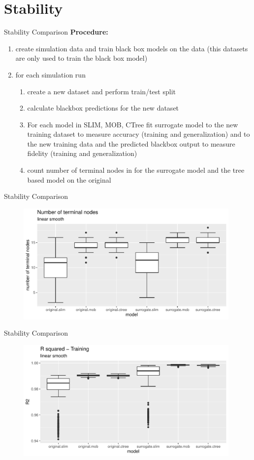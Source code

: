 \documentclass[9pt, xcolor=table]{beamer}
\begin{document}
\section{Stability}
\begin{frame}{Stability Comparison}
\textbf{Procedure:} 
\begin{enumerate}
    \item create simulation data and train black box models on the data (this datasets are only used to train the black box model)
    \item for each simulation run 
    \begin{enumerate}
        \item create a new dataset and perform train/test split
        \item calculate blackbox predictions for the new dataset
        \item For each model in SLIM, MOB, CTree fit surrogate model to the new training dataset to measure accuracy (training and generalization) and to the new training data and the predicted blackbox output to measure fidelity (training and generalization)
        \item count number of terminal nodes in for the surrogate model and the tree based model on the original 
    \end{enumerate}
\end{enumerate}
\end{frame}

\begin{frame}{Stability Comparison}
\begin{figure}
    \includegraphics[width=11cm]{Figures/Stability/linear_smooth/nofnodes.pdf}
\end{figure}
\end{frame}


\begin{frame}{Stability Comparison}
\begin{figure}
    \includegraphics[width=11cm]{Figures/Stability/linear_smooth/r2_train.pdf}
\end{figure}
\end{frame}
\end{document}
